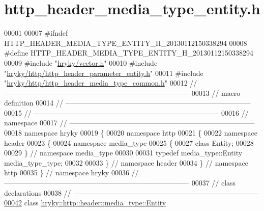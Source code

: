 \hypertarget{http__header__media__type__entity_8h_source}{\section{http\-\_\-header\-\_\-media\-\_\-type\-\_\-entity.\-h}
}

\begin{DoxyCode}
00001 
00007 \textcolor{preprocessor}{#ifndef HTTP\_HEADER\_MEDIA\_TYPE\_ENTITY\_H\_20130112150338294}
00008 \textcolor{preprocessor}{}\textcolor{preprocessor}{#define HTTP\_HEADER\_MEDIA\_TYPE\_ENTITY\_H\_20130112150338294}
00009 \textcolor{preprocessor}{}\textcolor{preprocessor}{#include "\hyperlink{vector_8h}{hryky/vector.h}"}
00010 \textcolor{preprocessor}{#include "\hyperlink{http__header__parameter__entity_8h}{hryky/http/http_header_parameter_entity.h}"}
00011 \textcolor{preprocessor}{#include "\hyperlink{http__header__media__type__common_8h}{hryky/http/http_header_media_type_common.h}"}
00012 \textcolor{comment}{//
      ------------------------------------------------------------------------------}
00013 \textcolor{comment}{// macro definition}
00014 \textcolor{comment}{//
      ------------------------------------------------------------------------------}
00015 \textcolor{comment}{//
      ------------------------------------------------------------------------------}
00016 \textcolor{comment}{// namespace}
00017 \textcolor{comment}{//
      ------------------------------------------------------------------------------}
00018 \textcolor{keyword}{namespace }hryky
00019 \{
00020 \textcolor{keyword}{namespace }http
00021 \{
00022 \textcolor{keyword}{namespace }header
00023 \{
00024 \textcolor{keyword}{namespace }media\_type
00025 \{
00027     \textcolor{keyword}{class }Entity;
00028 
00029 \} \textcolor{comment}{// namespace media\_type}
00030 
00031 \textcolor{keyword}{typedef} media\_type::Entity media\_type\_type;
00032 
00033 \} \textcolor{comment}{// namespace header}
00034 \} \textcolor{comment}{// namespace http}
00035 \} \textcolor{comment}{// namespace hryky}
00036 \textcolor{comment}{//
      ------------------------------------------------------------------------------}
00037 \textcolor{comment}{// class declarations}
00038 \textcolor{comment}{//
      ------------------------------------------------------------------------------}
\hypertarget{http__header__media__type__entity_8h_source_l00042}{}\hyperlink{classhryky_1_1http_1_1header_1_1media__type_1_1_entity}{00042} \textcolor{comment}{}\textcolor{keyword}{class }\hyperlink{classhryky_1_1http_1_1header_1_1media__type_1_1_entity}{hryky::http::header::media_type::Entity}

\end{DoxyCode}
